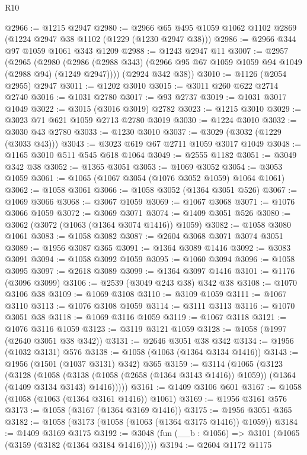 \begin{lexlean}{R10}
\begin{coremodule}
@2966 := @1215 @2947
@2980 := @2966 @65 @495 @1059 @1062 @1102 @2869 (@1224 @2947 @38 @1102 (@1229 (@1230 @2947 @38)))
@2986 := @2966 @344 @97 @1059 @1061 @343 @1209
@2988 := @1243 @2947 @11
@3007 := @2957
    (@2965
      (@2980 (@2986 (@2988 @343) (@2966 @95 @67 @1059 @1059 @94 @1049 (@2988 @94) (@1249 @2947))))
      (@2924 @342 @38))
@3010 := @1126 (@2054 @2955) @2947
@3011 := @1202 @3010
@3015 := @3011 @260 @622 @2714 @2740
@3016 := @1031 @2780
@3017 := @93 @2737
@3019 := @1031 @3017 @1049
@3022 := @3015 (@3016 @3019) @2782
@3023 := @1215 @3010
@3029 := @3023 @71 @621 @1059 @2713 @2780 @3019
@3030 := @1224 @3010
@3032 := @3030 @43 @2780
@3033 := @1230 @3010
@3037 := @3029 (@3032 (@1229 (@3033 @43)))
@3043 := @3023 @619 @67 @2711 @1059 @3017 @1049
@3048 := @1165 @3010 @511 @545 @618 @1064
@3049 := @2555 @1182
@3051 := @3049 @342 @38
@3052 := @1365 @3051
@3053 := @1069 @3052
@3054 := @3053 @1059
@3061 := @1065 (@1067 @3054 (@1076 @3052 @1059) @1064 @1061)
@3062 := @1058 @3061
@3066 := @1058 @3052 (@1364 @3051 @526)
@3067 := @1069 @3066
@3068 := @3067 @1059
@3069 := @1067 @3068
@3071 := @1076 @3066 @1059
@3072 := @3069 @3071
@3074 := @1409 @3051 @526
@3080 := @3062 (@3072 (@1063 (@1364 @3074 @1416)) @1059)
@3082 := @1058 @3080 @1061
@3083 := @1058 @3082
@3087 := @2604 @3068 @3071 @3074 @3051
@3089 := @1956 @3087 @365
@3091 := @1364 @3089 @1416
@3092 := @3083 @3091
@3094 := @1058 @3092 @1059
@3095 := @1060 @3094
@3096 := @1058 @3095
@3097 := @2618 @3089
@3099 := @1364 @3097 @1416
@3101 := @1176 (@3096 @3099)
@3106 := @2539 (@3049 @243 @38) @342 @38
@3108 := @1070 @3106 @38
@3109 := @1069 @3108
@3110 := @3109 @1059
@3111 := @1067 @3110
@3113 := @1076 @3108 @1059
@3114 := @3111 @3113
@3116 := @1070 @3051 @38
@3118 := @1069 @3116 @1059
@3119 := @1067 @3118
@3121 := @1076 @3116 @1059
@3123 := @3119 @3121 @1059
@3128 := @1058 (@1997 (@2640 @3051 @38 @342))
@3131 := @2646 @3051 @38 @342
@3134 := @1956 (@1032 @3131) @576
@3138 := @1058 (@1063 (@1364 @3134 @1416))
@3143 := @1956 (@1501 (@1037 @3131) @342) @365
@3159 := @3114
    (@1065
      (@3123
        (@3128
          (@1058
            (@3138 (@1058 (@2658 (@1364 @3143 @1416)) @1059))
            (@1364 (@1409 @3134 @3143) @1416)))))
@3161 := @1409 @3106 @601
@3167 := @1058 (@1058 (@1063 (@1364 @3161 @1416)) @1061)
@3169 := @1956 @3161 @576
@3173 := @1058 (@3167 (@1364 @3169 @1416))
@3175 := @1956 @3051 @365
@3182 := @1058 (@3173 (@1058 (@1063 (@1364 @3175 @1416)) @1059))
@3184 := @1409 @3169 @3175
@3192 := @3048 (fun (__b : @1056) => @3101 (@1065 (@3159 (@3182 (@1364 @3184 @1416)))))
@3194 := @2604 @1172 @1175

\end{coremodule}
\end{lexlean}
